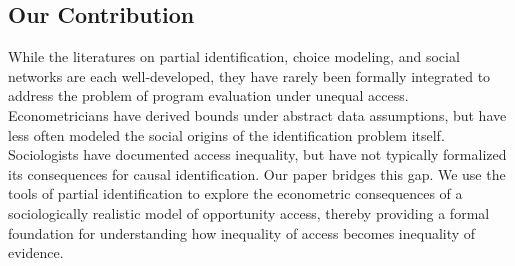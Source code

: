 \subsection{Our Contribution}
While the literatures on partial identification, choice modeling, and social networks are each well-developed, they have rarely been formally integrated to address the problem of program evaluation under unequal access. Econometricians have derived bounds under abstract data assumptions, but have less often modeled the social origins of the identification problem itself. Sociologists have documented access inequality, but have not typically formalized its consequences for causal identification. Our paper bridges this gap. We use the tools of partial identification to explore the econometric consequences of a sociologically realistic model of opportunity access, thereby providing a formal foundation for understanding how inequality of access becomes inequality of evidence.